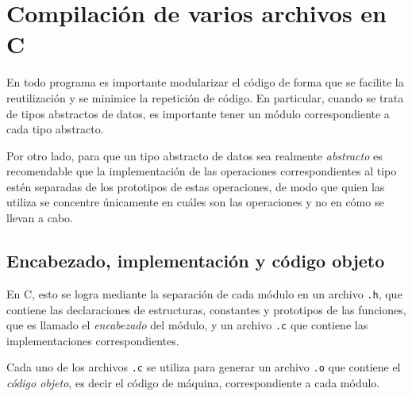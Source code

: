 
%

\renewcommand{\chaptermark}[1]{\markboth{#1}{}}
\renewcommand{\thesection}{\arabic{section}}
\chapter*{Compilación de varios archivos en C}

En todo programa es importante modularizar el código de forma que se facilite
la reutilización y se minimice la repetición de código.
En particular, cuando se trata de tipos abstractos de datos, es importante
tener un módulo correspondiente a cada tipo abstracto.

Por otro lado, para que un tipo abstracto de datos sea realmente
\textit{abstracto} es recomendable que la implementación de las operaciones
correspondientes al tipo estén separadas de los prototipos de estas
operaciones, de modo que quien las utiliza se concentre únicamente en cuáles
son las operaciones y no en cómo se llevan a cabo.

\section{Encabezado, implementación y código objeto}

En C, esto se logra mediante la separación de cada módulo en un archivo
\verb!.h!, que contiene las declaraciones de estructuras, constantes y
prototipos de las funciones, que es llamado el \textit{encabezado} del módulo,
y un archivo \verb!.c! que contiene las implementaciones correspondientes.

Cada uno de los archivos \verb!.c! se utiliza para generar un archivo
\verb!.o! que contiene el \textit{código objeto}, es decir el código de
máquina, correspondiente a cada módulo.

